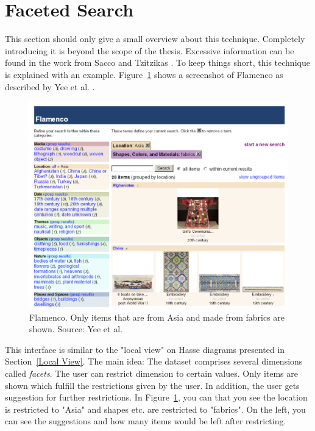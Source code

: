 \documentclass[11pt]{report}
\begin{document}
\section{Faceted Search}
\label{dyafs}

This section should only give a small overview about this technique. Completely introducing it is beyond the scope of the thesis. Excessive information can be found in the work from Sacco and Tzitzikas \cite{Sacco2009}. To keep things short, this technique is explained with an example. Figure~\ref{figure:flamenco} shows a screenshot of Flamenco as described by Yee et al. \cite{Yee2003}. \\

\begin{figure}[!ht]
	\centering
	\includegraphics[width=\linewidth]{images/flamenco}
\caption{Flamenco. Only items that are from Asia and made from fabrics are shown. Source: Yee et al. \cite{Yee2003}}
\label{figure:flamenco}
\end{figure}

This interface is similar to the "local view" on Hasse diagrams presented in Section~\ref{Local View}. The main idea: The dataset comprises several dimensions called \textit{facets}. The user can restrict dimension to certain values. Only items are shown which fulfill the restrictions given by the user. In addition, the user gets suggestion for further restrictions. In Figure~\ref{figure:flamenco}, you can that you see the location is restricted to "Asia" and shapes etc. are restricted to "fabrics". On the left, you can see the suggestions and how many items would be left after restricting. \\
\end{document}
